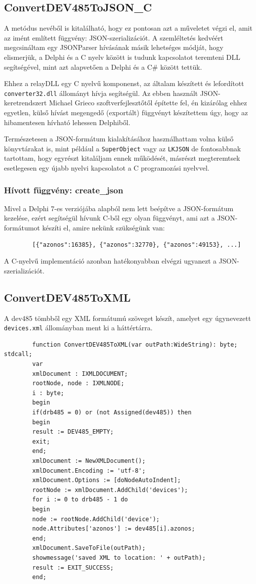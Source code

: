 \documentclass[tocnopagenum]{thesis-ekf}
\theoremstyle{definition}
\theoremstyle{remark}
\begin{document}
	\subsection{ConvertDEV485ToJSON\_C}
	A metódus nevéből is kitalálható, hogy ez pontosan azt a műveletet végzi el, amit az imént említett függvény: JSON-szerializációt. A szemléltetés kedvéért megcsináltam egy JSONParser hívásának másik lehetséges módját, hogy elismerjük, a Delphi és a C nyelv között is tudunk kapcsolatot teremteni DLL segítségével, mint azt alapvetően a Delphi és a C\# között tettük.
	
	Ehhez a relayDLL egy C nyelvű komponenst, az általam készített és lefordított \verb*|converter32.dll| állományt hívja segítségül. Az ebben használt JSON-keretrendszert Michael Grieco szoftverfejlesztőtől építette fel, én kizárólag ehhez egyetlen, külső hívást megengedő (exportált) függvényt készítettem úgy, hogy az hibamentesen hívható lehessen Delphiből.\cite{mgrieco}
	
	Természetesen a JSON-formátum kialakításához használhattam volna külső könyvtárakat is, mint például a \verb*|SuperObject| \cite{json_superobject}
	vagy az \verb*|LKJSON| \cite{json_lkjson} de fontosabbnak tartottam, hogy egyrészt kitaláljam ennek működését, másrészt megteremtsek esetlegesen egy újabb nyelvi kapcsolatot a C programozási nyelvvel.

	\subsubsection{Hívott függvény: create\_json}
	Mivel a Delphi 7-es verziójába alapból nem lett beépítve a JSON-formátum kezelése, ezért segítségül hívunk C-ből egy olyan függvényt, ami azt a JSON-formátumot készíti el, amire nekünk szükségünk van: 
	\begin{verbatim} 
		[{"azonos":16385}, {"azonos":32770}, {"azonos":49153}, ...]
	\end{verbatim}
	A C-nyelvű implementáció azonban hatékonyabban elvégzi ugyanezt a JSON-szerializációt.
	\subsection{ConvertDEV485ToXML} 
	A dev485 tömbből egy XML formátumú szöveget készít, amelyet egy úgynevezett \verb*|devices.xml| állományban ment ki a háttértárra.
	
	\begin{verbatim}
		function ConvertDEV485ToXML(var outPath:WideString): byte; stdcall;
		var
		xmlDocument : IXMLDOCUMENT;
		rootNode, node : IXMLNODE;
		i : byte;
		begin
		if(drb485 = 0) or (not Assigned(dev485)) then
		begin
		result := DEV485_EMPTY;
		exit;
		end;
		xmlDocument := NewXMLDocument();
		xmlDocument.Encoding := 'utf-8';
		xmlDocument.Options := [doNodeAutoIndent];
		rootNode := xmlDocument.AddChild('devices');
		for i := 0 to drb485 - 1 do 
		begin
		node := rootNode.AddChild('device');
		node.Attributes['azonos'] := dev485[i].azonos;
		end;
		xmlDocument.SaveToFile(outPath);
		showmessage('saved XML to location: ' + outPath);
		result := EXIT_SUCCESS;
		end;
	\end{verbatim}
\end{document}
